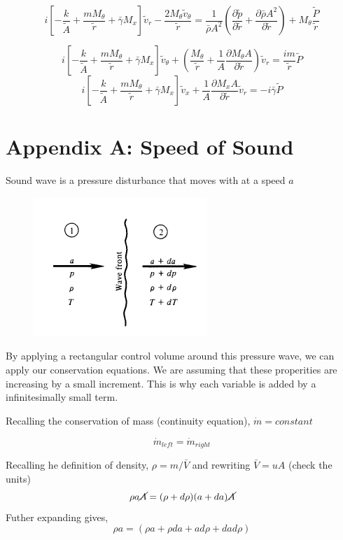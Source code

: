 \documentclass[12pt]{article}
\begin{document}
\[ i\left[ 
- \frac{k}{\tilde{A}} + 
\frac{m M_{\theta}}{\tilde{r}} + 
\bar{\gamma} M_x 
\right] \tilde{v}_r - 
\frac{2 M_{\theta} \tilde{v}_{\theta}}{\tilde{r}} = 
\frac{1}{\bar{\rho} A^2}\left( \frac{\partial \tilde{p}}{\partial \tilde{r}} +
\frac{\partial \bar{\rho} A^2}{\partial \tilde{r}}  \right)+ 
M_{\theta}\frac{\tilde{P}}{\tilde{r}}\]


\[i\left[ - \frac{k}{\tilde{A}} + \frac{m M_{\theta}}{\tilde{r}} + \bar{\gamma} M_x \right] \tilde{v}_{\theta} + \left(\frac{ M_{\theta}}{\tilde{r}}  + \frac{1}{A} \frac{\partial M_{\theta}A}{\partial \tilde{r}}\right)\tilde{v}_r = \frac{i m}{\tilde{r}}\tilde{P}\]
\[i\left[ - \frac{k}{\tilde{A}} + \frac{m M_{\theta}}{\tilde{r}} + \bar{\gamma} M_x \right] \tilde{v}_x  + \frac{1}{A} \frac{\partial M_x A}{\partial \tilde{r}}\tilde{v}_r = -i \bar{\gamma}\tilde{P} \]
\section{Appendix A: Speed of Sound}




Sound wave is a pressure disturbance that moves with at a speed $a$

\begin{figure}[h!]
	\centering
	\includegraphics[width=0.3\linewidth]{screenshot001}
	\caption{}
	\label{fig:screenshot001}
\end{figure}

By applying a rectangular control volume around this pressure wave, we can apply our conservation equations. We are assuming that these properities are increasing by a small increment. This is why each variable is added by a infinitesimally small term.

Recalling the conservation of mass (continuity equation), $\dot{m} = constant$

\[\dot{m}_{left} = \dot{m}_{right}\]

Recalling he definition of density, $\rho = m/\bar{V}$ and rewriting $\bar{V} = uA$ (check the units)
\[\rho a \cancel{A}  = (\rho + d\rho)(a + da) \cancel{A}\]
Futher expanding gives,
\[\rho a   = (\rho a+ \rho da + a d\rho + da d\rho)\]
\end{document}

